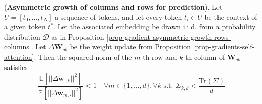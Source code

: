 \begin{corollary}
\label{corollary-gradient-asymmetric-growth-rows-columns}
%
(\textbf{Asymmetric growth of columns and rows for prediction}).
%
%
Let $U = [t_0, \dots, t_N]$ a sequence of tokens, and let every token $t_i \in U$ be the context of a given token $t^*$.
%
Let the associated embedding be drawn i.i.d. from a probability distribution $\mathcal{D}$ as in Proposition \ref{prop-gradient-asymmetric-growth-rows-columns}.
%
Let $\Delta \bm{W}_{qk}$ be the weight update from Proposition \ref{prop-gradients-self-attention}.
%
Then the squared norm of the $m$-th row and $k$-th column of $\bm{W}_{qk}$ satisfies
%
\begin{equation}
\frac{\mathbb{E}\left[ ||\Delta \bm{w}_{\cdot, k}||^2 \right]}{\mathbb{E}\left[ ||\Delta \bm{w}_{m, \cdot}||^2 \right]} < 1 \quad \forall m \in \{1,\dots,d\}, \forall k \,\,\text{s.t.} \,\, \Sigma_{k,k} < \frac{\text{Tr}(\Sigma)}{d}
\end{equation}
%
\end{corollary}